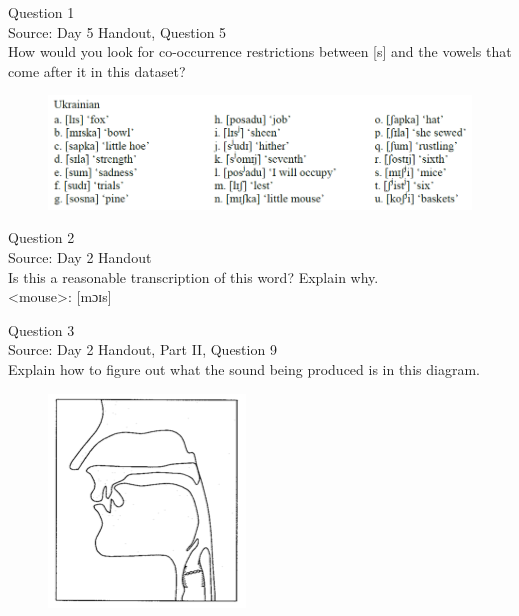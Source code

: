 \documentclass[12pt]{article}
\begin{document}
{\large Question 1}\\

Source: Day 5 Handout, Question 5\\

How would you look for co-occurrence restrictions between [s] and the vowels that come after it in this dataset?\\

\begin{figure}[H]
\includegraphics{../images/ukrainian.png}
\end{figure}

\newpage

{\large Question 2}\\

Source: Day 2 Handout\\

Is this a reasonable transcription of this word? Explain why.\\

<mouse>: {[mɔɪs]}


\newpage

{\large Question 3}\\

Source: Day 2 Handout, Part II, Question 9\\

Explain how to figure out what the sound being produced is in this diagram.\\

\begin{figure}[H]
\includegraphics{../images/sagittal_z.png}
\end{figure}
\end{document}
